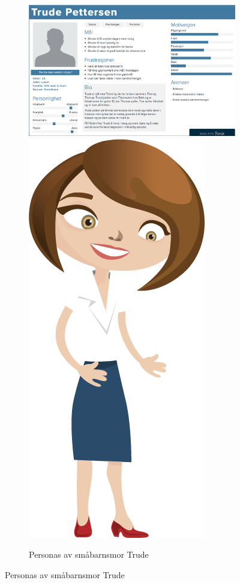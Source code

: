 \begin{figure}[H]
    \begin{figure}
    \includegraphics[scale=0.28]{images/personas/personasTrude}
    \includegraphics[scale=0.27]{images/personas/trude}
    \caption{Personas av småbarnsmor Trude}
    \label{fig:personasTrude}
    \end{figure}
\end{figure}

